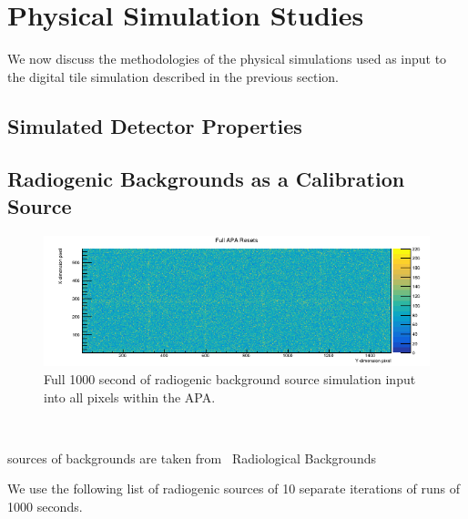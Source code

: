 \section{Physical Simulation Studies}

We now discuss the methodologies of the physical simulations used as input to the digital tile simulation described in the previous section.

\subsection{Simulated Detector Properties}


\subsection{Radiogenic Backgrounds as a Calibration Source}

\begin{figure}[]
\centering
\includegraphics[width=\textwidth]{images/fullApaResets.png}
\caption{Full 1000 second of radiogenic background source simulation input into all pixels within the APA.}
\end{figure}~\label{fig:background_simulation}


sources of backgrounds are taken from~\citep{DUNE-FD_TDRv4:Abi_2020}
Radiological Backgrounds~\citep{ar39_backgrounds, phd_backgrounds}

We use the following list of radiogenic sources of 10 separate iterations of runs of 1000 seconds.

